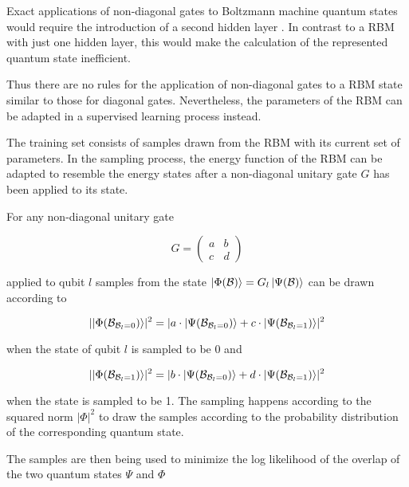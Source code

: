 Exact applications of non-diagonal gates to Boltzmann machine quantum states would require the 
introduction of a second hidden layer \cite{carleo2018constructing}. In contrast to a RBM with just one hidden 
layer, this would make the calculation of the represented quantum state inefficient.

Thus there are no rules for the application of non-diagonal gates to a RBM state similar to those for 
diagonal gates. Nevertheless, the parameters of the RBM can be adapted in a 
supervised learning process instead.

The training set consists of samples drawn from the RBM with its 
current set of parameters. In the sampling process, the energy function of the RBM can be adapted 
to resemble the energy states after a non-diagonal unitary gate $G$ has been applied to its state.

For any non-diagonal unitary gate

\begin{equation}
    G =  \begin{pmatrix}
        a & b \\
        c & d
    \end{pmatrix}
\end{equation}

applied to qubit $l$ samples from the state $\ket{\Phi(\mathcal{B})} = G_l\ket{\Psi(\mathcal{B})}$ can be drawn according to 

\begin{equation}
    \lvert \ket{\Phi(\mathcal{B}_{\mathcal{B}_l = 0})} \rvert^2 = 
    \lvert  a \cdot \ket{\Psi(\mathcal{B}_{\mathcal{B}_l = 0})} +
            c \cdot \ket{\Psi(\mathcal{B}_{\mathcal{B}_l = 1})}
    \rvert^2
\end{equation}

when the state of qubit $l$ is sampled to be 0 and 

\begin{equation}
    \lvert \ket{\Phi(\mathcal{B}_{\mathcal{B}_l = 1})} \rvert^2 = 
    \lvert  b \cdot \ket{\Psi(\mathcal{B}_{\mathcal{B}_l = 0})} +
            d \cdot \ket{\Psi(\mathcal{B}_{\mathcal{B}_l = 1})}
    \rvert^2
\end{equation}

when the state is sampled to be 1. The sampling happens according to the squared norm
$\lvert \Phi \rvert^2$ to draw the samples according to the probability distribution of the 
corresponding quantum state.

The samples are then being used to minimize the log likelihood of the overlap of the two quantum 
states $\Psi$ and $\Phi$

